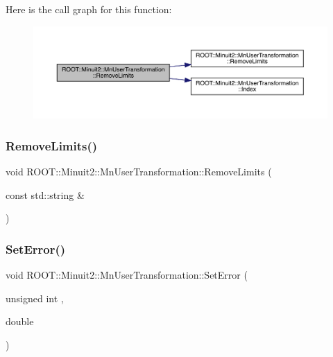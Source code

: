 Here is the call graph for this function\+:\nopagebreak
\begin{figure}[H]
\begin{center}
\leavevmode
\includegraphics[width=350pt]{d9/d98/classROOT_1_1Minuit2_1_1MnUserTransformation_ae5e9a3037483cfc354b739ef44cd1867_cgraph}
\end{center}
\end{figure}
\mbox{\label{classROOT_1_1Minuit2_1_1MnUserTransformation_ae5e9a3037483cfc354b739ef44cd1867}} 
\subsubsection{\texorpdfstring{RemoveLimits()}{RemoveLimits()}\hspace{0.1cm}{\footnotesize\ttfamily [4/4]}}
{\footnotesize\ttfamily void R\+O\+O\+T\+::\+Minuit2\+::\+Mn\+User\+Transformation\+::\+Remove\+Limits (\begin{DoxyParamCaption}\item[{const std\+::string \&}]{ }\end{DoxyParamCaption})}

\mbox{\label{classROOT_1_1Minuit2_1_1MnUserTransformation_a6256d78c2aafb1142eadc811ee981d79}} 
\subsubsection{\texorpdfstring{SetError()}{SetError()}\hspace{0.1cm}{\footnotesize\ttfamily [1/4]}}
{\footnotesize\ttfamily void R\+O\+O\+T\+::\+Minuit2\+::\+Mn\+User\+Transformation\+::\+Set\+Error (\begin{DoxyParamCaption}\item[{unsigned int}]{,  }\item[{double}]{ }\end{DoxyParamCaption})}


